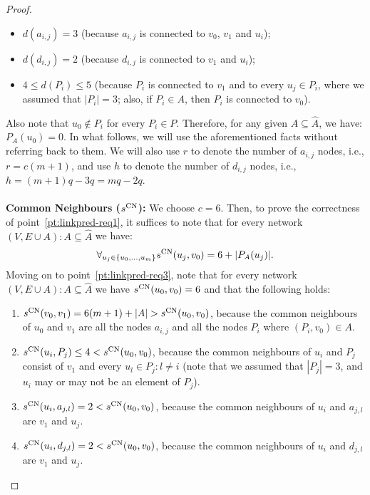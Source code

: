 \documentclass[twocolumn]{article}
\newcommand{\FA}{\widehat{A}}
\newcommand{\PA}{P_{A}}
\newcommand{\sCN}{s^{\text{\normalfont CN}}}
\begin{document}
\begin{proof}
\begin{itemize}
\item $d(a_{i,j})=3$ (because $a_{i,j}$ is connected to $v_0$, $v_1$ and $u_i$);
\item $d(d_{i,j})=2$  (because $d_{i,j}$ is connected to $v_1$ and $u_i$);
\item $4 \leq d(P_i) \leq 5$ (because $P_i$ is connected to $v_1$ and to every $u_j\in P_i$, where we assumed that $|P_i|=3$; also, if $P_i\in A$, then $P_i$ is connected to $v_0$).
\end{itemize}

\noindent Also note that $u_0 \notin P_i$ for every $P_i\in P$.
Therefore, for any given $A \subseteq \FA$, we have: $\PA(u_0)=0$.
In what follows, we will use the aforementioned facts without referring back to them. We will also use $r$ to denote the number of $a_{i,j}$ nodes, i.e., $r=c(m+1)$, and use $h$ to denote the number of  $d_{i,j}$ nodes, i.e., $h=(m+1)q - 3q=mq - 2q$.
\ \\\\
\noindent \textbf{Common Neighbours ($\sCN$):} We choose $c=6$. Then, to prove the correctness of point~\ref{pt:linkpred-req1}, it suffices to note that for every network $(V,E\cup A):A\subseteq \FA$ we have:
$$
\forall_{u_j\in\{u_0,\ldots, u_m\}} \sCN(u_j,v_0)=6+|\PA(u_j)|.
$$
Moving on to point~\ref{pt:linkpred-req3}, note that for every network $(V,E\cup A):A\subseteq \FA$ we have $\sCN(u_0,v_0)=6$ and that the following holds:

\begin{enumerate}[label=(\roman*)]
\item $\sCN(v_0,v_1)= 6(m+1) + |A| > \sCN(u_0,v_0)$, because the common neighbours of $u_0$ and $v_1$ are all the nodes $a_{i,j}$ and all the nodes $P_i$ where $(P_i,v_0)\in A$.

\item $\sCN(u_i,P_j) \leq 4 < \sCN(u_0,v_0)$, because the common neighbours of $u_i$ and $P_j$ consist of $v_1$ and every $u_l \in P_j : l \neq i$ (note that we assumed that $|P_j|=3$, and $u_i$ may or may not be an element of $P_j$). 

\item $\sCN(u_i,a_{j,l}) = 2 < \sCN(u_0,v_0)$, because the common neighbours of $u_i$ and $a_{j,l}$ are $v_1$ and $u_j$.

\item $\sCN(u_i,d_{j,l}) = 2 < \sCN(u_0,v_0)$, because the common neighbours of $u_i$ and $d_{j,l}$ are $v_1$ and $u_j$.


\end{enumerate}
\end{proof}
\end{document}

